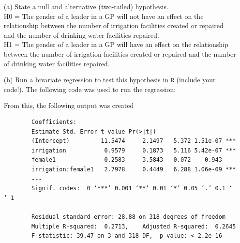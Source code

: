 \documentclass[12pt,letterpaper]{article}
\begin{document}
\newpage
\begin{enumerate}
	\item [(a)] State a null and alternative (two-tailed) hypothesis. \\ 
		\noindent H0 = The gender of a leader in a GP will not have an effect on the relationship between the number of irrigation facilities created or repaired and the number of drinking water facilities repaired.  \\
		\noindent H1 = The gender of a leader in a GP will have an effect on the relationship between the number of irrigation facilities created or repaired and the number of drinking water facilities repaired.
	\vspace{6cm}
	\item [(b)] Run a bivariate regression to test this hypothesis in \texttt{R} (include your code!).
	\noindent The following code was used to run the regression:
	
	\noindent From this, the following output was created
	\begin{verbatim}
		Coefficients:
		Estimate Std. Error t value Pr(>|t|)    
		(Intercept)         11.5474     2.1497   5.372 1.51e-07 ***
		irrigation           0.9579     0.1873   5.116 5.42e-07 ***
		female1             -0.2583     3.5843  -0.072    0.943    
		irrigation:female1   2.7978     0.4449   6.288 1.06e-09 ***
		---
		Signif. codes:  0 ‘***’ 0.001 ‘**’ 0.01 ‘*’ 0.05 ‘.’ 0.1 ‘ ’ 1
		
		Residual standard error: 28.88 on 318 degrees of freedom
		Multiple R-squared:  0.2713,	Adjusted R-squared:  0.2645 
		F-statistic: 39.47 on 3 and 318 DF,  p-value: < 2.2e-16
	\end{verbatim}
	

\end{enumerate}
\end{document}
